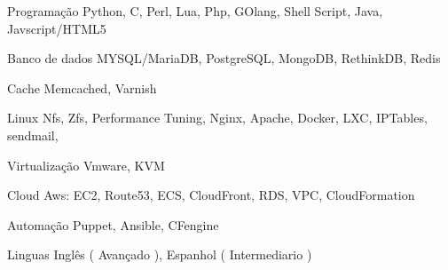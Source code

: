 

\begin{cvskills}

  \cvskill
    {Programação} %
    {Python, C, Perl, Lua, Php, GOlang, Shell Script, Java, Javscript/HTML5} %

  \cvskill
    {Banco de dados} %
    {MYSQL/MariaDB, PostgreSQL, MongoDB, RethinkDB, Redis} %

  \cvskill
    {Cache} %
    {Memcached, Varnish} %

\cvskill
    {Linux} %
    {Nfs, Zfs, Performance Tuning, Nginx, Apache, Docker, LXC, IPTables, sendmail, } %

\cvskill
    {Virtualização} %
    {Vmware, KVM} %

\cvskill
  {Cloud} %
  {Aws: EC2, Route53, ECS, CloudFront, RDS, VPC, CloudFormation} %

\cvskill
  {Automação} %
  {Puppet, Ansible, CFengine} %

\cvskill
  {Linguas} %
  {Inglês ( Avançado ), Espanhol ( Intermediario )} %

\end{cvskills}
